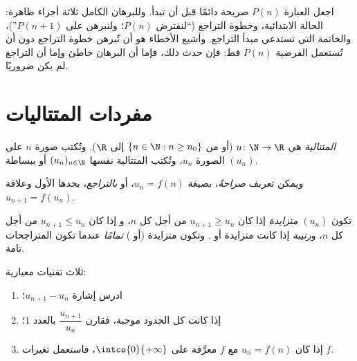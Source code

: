 \begin{method}\label{met:g12:seq:induction}
اجعل العبارة $P(n)$ صريحة دائمًا قبل أن تبدأ. وللبرهان الكامل
ثلاثة أجزاء ظاهرة: الحالة الابتدائية، وخطوة التراجع (``لنفترض $P(n)$؛
ولنبرهن على $P(n+1)$'')، والخاتمة التي تستدعي مبدأ التراجع.
وأشيع الأخطاء هو أن تُبرهن خطوة التراجع دون أن تُستعمل
الفرضية $P(n)$ قط: فإن حدث ذلك، فإما أن البرهان خاطئ وإما أن التراجع
لم يكن ضروريًا.
\end{method}

\section{مفردات المتتاليات}

\begin{definition}[المتتالية]\label{def:g12:seq:sequence}
\emph{المتتالية} هي  $u \colon \N \to \R$ (أو من
$\{n \in \N : n \geq n_0\}$ إلى $\R$). وتُكتب صورة $n$ على الصورة $u_n$، وتُكتب
المتتالية نفسها $(u_n)_{n\in\N}$ أو ببساطة $(u_n)$.
\end{definition}

ويمكن تعريف  \emph{صراحةً}، بصيغة $u_n = f(n)$، أو
\emph{بالتراجع}، بحدها الأول وعلاقة $u_{n+1} = f(u_n)$.

\begin{definition}[الرتابة]\label{def:g12:seq:monotonic}
تكون  $(u_n)$ \emph{متزايدة} إذا كان
$u_{n+1} \geq u_n$ من أجل كل $n$، و\emph{} إذا كان $u_{n+1} \leq u_n$ من
أجل كل $n$، و\emph{رتيبة} إذا كانت متزايدة أو . وتكون
متزايدة (أو ) \emph{تمامًا} عندما تكون المتراجحات
تامة.
\end{definition}

\begin{method}\label{met:g12:seq:monotonicity}
ثلاث تقنيات معيارية:
\begin{enumerate}
  \item ادرس إشارة $u_{n+1} - u_n$؛
  \item إذا كانت كل الحدود موجبة، فقارن $\dfrac{u_{n+1}}{u_n}$ بالعدد $1$؛
  \item إذا كان $u_n = f(n)$ مع $f$ معرَّفة على $\intco{0}{+\infty}$، فاستعمل
        تغيرات $f$.
\end{enumerate}
\end{method}

